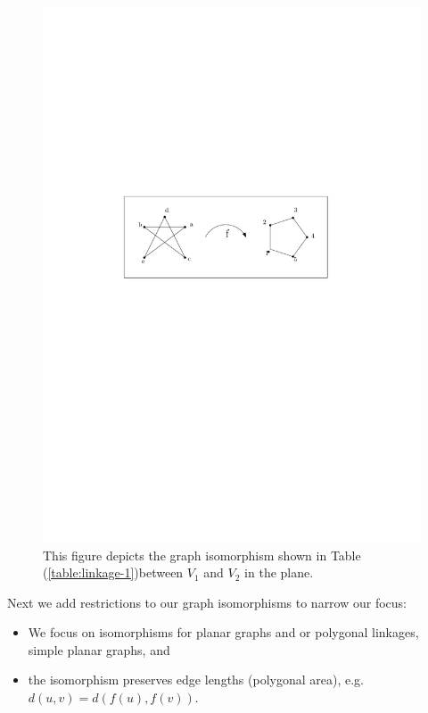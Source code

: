 \begin{figure}[!h]
\begin{center}
\includegraphics[scale=1]{graphics/graphIsomorphismExample.pdf}
\end{center} 
\caption{This figure depicts the graph isomorphism shown in Table (\ref{table:linkage-1})between 
$V_1$ and $V_2$ in the plane.}
\label{fig:linkage-3}
\end{figure}
Next we add restrictions to our graph isomorphisms to narrow our focus:
\begin{itemize}
\item[\rn{1}] We focus on isomorphisms for planar graphs and or polygonal linkages, simple planar 
graphs, and
\item[\rn{2}] the isomorphism preserves edge lengths (polygonal area), e.g. $d(u,v) = d(f(u),f(v))$.
\end{itemize}  


















